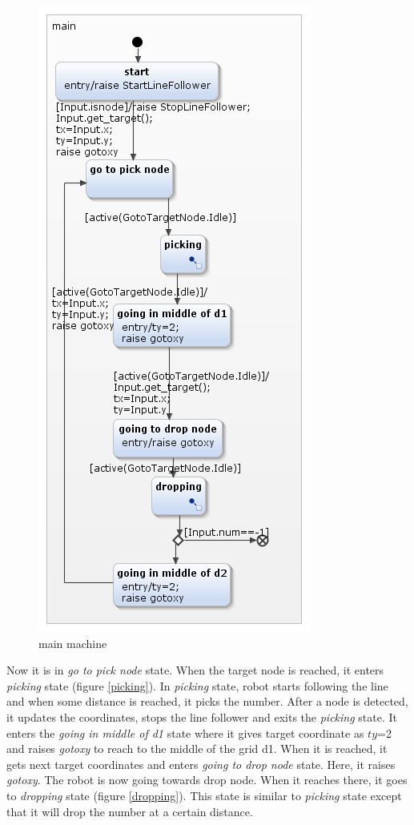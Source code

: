 \documentclass[a4paper,12pt,oneside]{book}
\begin{document}
\begin{itemize}
\begin{figure}[]
	\includegraphics[scale=.8]{main.png}
	\caption{main machine}
	\label{main}
	\end{figure} 
Now it is in \textit{go to pick node} state. When the target node is reached, it enters \textit{picking} state (figure \ref{picking}). In \textit{picking} state, robot starts following the line and when some distance is reached, it picks the number. After a node is detected, it updates the coordinates, stops the line follower and exits the \textit{picking} state. It enters the \textit{going in middle of d1} state where it gives target coordinate as $ty$=2 and raises \textit{gotoxy} to reach to the middle of the grid d1. When it is reached, it gets next target coordinates and enters \textit{going to drop node} state. Here, it raises \textit{gotoxy}. The robot is now going towards drop node. When it reaches there, it goes to \textit{dropping} state (figure \ref{dropping}). This state is similar to \textit{picking} state except that it will drop the number at a certain distance. 

\end{itemize}
\end{document}
